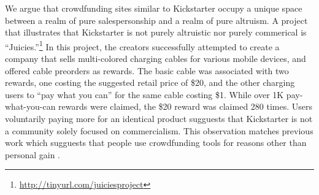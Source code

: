 \documentclass[letterpaper]{article}
\begin{document}
We argue that crowdfunding sites similar to Kickstarter occupy a unique space between a realm of pure salespersonship and a realm of pure altruism. A project that illustrates that Kickstarter is not purely altruistic nor purely commerical is ``Juicies.''\footnote{\url{http://tinyurl.com/juiciesproject}} In this project, the creators successfully attempted to create a company that sells multi-colored charging cables for various mobile devices, and offered cable preorders as rewards. The basic cable was associated with two rewards, one costing the suggested retail price of \$20, and the other charging users to ``pay what you can'' for the same cable costing \$1. While over 1K pay-what-you-can rewards were claimed, the \$20 reward was claimed 280 times. Users voluntarily paying more for an identical product sugguests that Kickstarter is not a community solely focused on commercialism. This observation matches previous work which sugguests that people use crowdfunding tools for reasons other than personal gain \cite{van2011fighting}.
\end{document}
